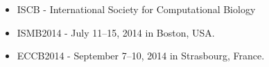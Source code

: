 \documentclass[svgnames]{beamer}
\begin{document}
{\begin{frame}
\begin{minipage}[c]{\linewidth}
\begin{minipage}[c]{\linewidth}
\begin{minipage}[c]{0.33\linewidth}
    \end{minipage}
    \end{minipage}

    \vspace{3ex}

    \begin{itemize}
        \item ISCB - International Society for Computational Biology
        \item ISMB2014 - July 11--15, 2014 in Boston, USA.
        \item ECCB2014 - September 7--10, 2014 in Strasbourg, France.
    \end{itemize}

    \vfill
\end{minipage}

\end{frame}

}{}


\end{document}
